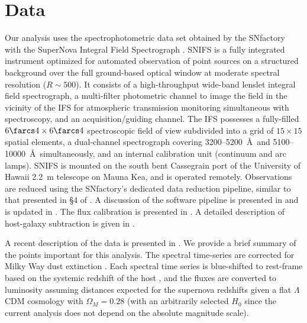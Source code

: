 \documentclass{aastex61}   	%
\begin{document}
\section{Data}
\label{data:sec}

Our analysis uses the spectrophotometric data set obtained by
the SNfactory with the SuperNova Integral Field
Spectrograph \citep[SNIFS,][]{2004SPIE.5249..146L}.  SNIFS is a fully integrated
instrument optimized for automated observation of point sources on a
structured background over the full ground-based optical window at
moderate spectral resolution ($R \sim 500$).  It consists of a
high-throughput wide-band lenslet integral field spectrograph, a
multi-filter photometric channel to image the field in the vicinity of
the IFS for atmospheric transmission monitoring simultaneous with
spectroscopy, and an acquisition/guiding channel.  The IFS possesses a
fully-filled $6\farcs 4 \times 6\farcs 4$ spectroscopic field of view
subdivided into a grid of $15 \times 15$ spatial elements, a
dual-channel spectrograph covering 3200--5200~\AA\ and 5100--10000~\AA\
simultaneously, and an internal calibration unit (continuum and arc
lamps).  SNIFS is mounted on the south bent Cassegrain port of the
University of Hawaii 2.2~m telescope on Mauna Kea, and is operated
remotely.  Observations are reduced using the SNfactory's dedicated data
reduction pipeline, similar to that presented in \S4 of \citet{2001MNRAS.326...23B}.
A discussion of the software pipeline is presented in
\citet{2006ApJ...650..510A} and is updated in \citet{2010ApJ...713.1073S}. 
The flux calibration is presented in \citet{2013A&A...549A...8B}.
A detailed
description of host-galaxy subtraction is given in \citet{2011MNRAS.418..258B}.

A recent description of the data is presented in \citet{2015ApJ...815...58F}.
We provide a brief summary of the points important for this analysis.
The spectral time-series  are corrected for Milky Way dust
extinction \citep{1989ApJ...345..245C,1998ApJ...500..525S}.  
Each spectral time series is
blue-shifted to rest-frame
based on the systemic redshift of the host \citep[c.f.][]{2013ApJ...770..107C}, and the fluxes are converted to luminosity assuming
distances expected for the supernova redshifts given a flat
$\Lambda$CDM cosmology with $\Omega_M = 0.28$ (with an arbitrarily selected
$H_0$ since the current analysis does not depend on the absolute magnitude scale).
\end{document}
